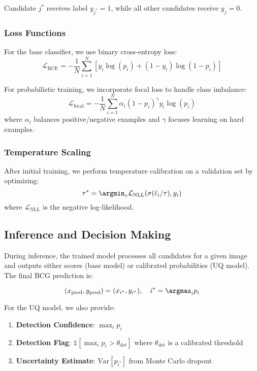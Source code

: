 \documentclass[twocolumn,10pt]{aastex631}
\begin{document}
Candidate $j^*$ receives label $y_{j^*} = 1$, while all other candidates receive $y_j = 0$.

\subsubsection{Loss Functions}
For the base classifier, we use binary cross-entropy loss:
\begin{equation}
\mathcal{L}_{\text{BCE}} = -\frac{1}{N} \sum_{i=1}^{N} [y_i \log(p_i) + (1-y_i) \log(1-p_i)]
\end{equation}

For probabilistic training, we incorporate focal loss to handle class imbalance:
\begin{equation}
\mathcal{L}_{\text{focal}} = -\frac{1}{N} \sum_{i=1}^{N} \alpha_i (1-p_i)^{\gamma} y_i \log(p_i)
\end{equation}
where $\alpha_i$ balances positive/negative examples and $\gamma$ focuses learning on hard examples.

\subsubsection{Temperature Scaling}
After initial training, we perform temperature calibration on a validation set by optimizing:
\begin{equation}
\tau^* = \argmin_{\tau} \mathcal{L}_{\text{NLL}}(\sigma(\ell_i / \tau), y_i)
\end{equation}
where $\mathcal{L}_{\text{NLL}}$ is the negative log-likelihood.

\subsection{Inference and Decision Making}

During inference, the trained model processes all candidates for a given image and outputs either scores (base model) or calibrated probabilities (UQ model). The final BCG prediction is:

\begin{equation}
(x_{\text{pred}}, y_{\text{pred}}) = (x_{i^*}, y_{i^*}), \quad i^* = \argmax_i p_i
\end{equation}

For the UQ model, we also provide:
\begin{enumerate}
\item \textbf{Detection Confidence}: $\max_i p_i$
\item \textbf{Detection Flag}: $\mathbb{1}[\max_i p_i > \theta_{\text{det}}]$ where $\theta_{\text{det}}$ is a calibrated threshold
\item \textbf{Uncertainty Estimate}: $\text{Var}[p_{i^*}]$ from Monte Carlo dropout
\end{enumerate}
\end{document}
